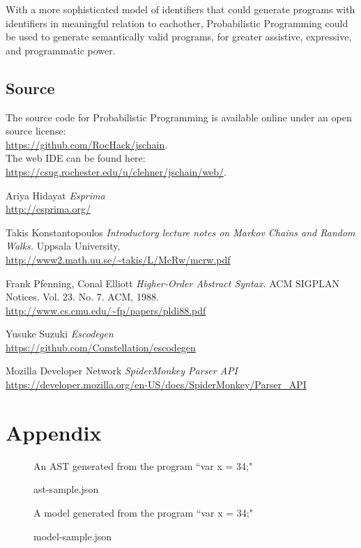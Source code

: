 \documentclass{article}
\begin{document}
With a more sophisticated model of identifiers that could generate programs with
identifiers in meaningful relation to eachother, Probabilistic Programming could
be used to generate semantically valid programs, for greater assistive,
expressive, and programmatic power.

\subsection{Source}

The source code for Probabilistic Programming is available online under an open
source license:\\
\url{https://github.com/RocHack/jschain}.\\
The web IDE can be found here:
\url{https://csug.rochester.edu/u/clehner/jschain/web/}.

\begin{thebibliography}{1}

	 Ariya Hidayat {\em Esprima}
		\\\url{http://esprima.org/}

	 Takis Konstantopoulos {\em Introductory lecture notes on
		Markov Chains and Random Walks.} Uppsala University,
		\\\url{http://www2.math.uu.se/~takis/L/McRw/mcrw.pdf}

	 Frank Pfenning, Conal Elliott
		{\em Higher-Order Abstract Syntax.}
		ACM SIGPLAN Notices. Vol. 23. No. 7. ACM, 1988.
		\\\url{http://www.cs.cmu.edu/~fp/papers/pldi88.pdf}

	 Yusuke Suzuki {\em Escodegen}
		\\\url{https://github.com/Constellation/escodegen}

	 Mozilla Developer Network {\em SpiderMonkey Parser API}
		\\\url{https://developer.mozilla.org/en-US/docs/SpiderMonkey/Parser_API}

\end{thebibliography}

\clearpage
\section*{Appendix}

\begin{figure}[h!]
	\caption{ast-sample.json}
	\label{fig:sample-ast}
	\centering
	An AST generated from the program ``var x = 34;"

	
\end{figure}

\begin{figure}[h!]
	\caption{model-sample.json}
	\label{fig:sample-model}
	\centering
	A model generated from the program ``var x = 34;"

	
\end{figure}
\end{document}
